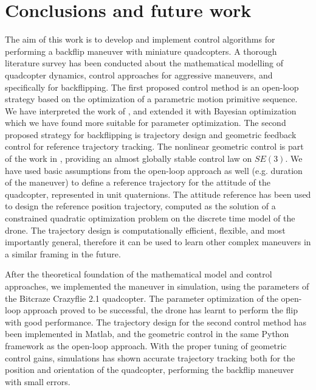 
\section{Conclusions and future work}
The aim of this work is to develop and implement control algorithms for performing a backflip maneuver with miniature quadcopters. A thorough literature survey has been conducted about the mathematical modelling of quadcopter dynamics, control approaches for aggressive maneuvers, and specifically for backflipping. The first proposed control method is an open-loop strategy based on the optimization of a parametric motion primitive sequence. We have interpreted the work of \cite{LSICRA2010}, and extended it with Bayesian optimization which we have found more suitable for parameter optimization. The second proposed strategy for backflipping is trajectory design and geometric feedback control for reference trajectory tracking. The nonlinear geometric control is part of the work in \cite{lelemc2010}, providing an almost globally stable control law on $SE(3)$. We have used basic assumptions from the open-loop approach as well (e.g. duration of the maneuver) to define a reference trajectory for the attitude of the quadcopter, represented in unit quaternions. The attitude reference has been used to design the reference position trajectory, computed as the solution of a constrained quadratic optimization problem on the discrete time model of the drone. The trajectory design is computationally efficient, flexible, and most importantly general, therefore it can be used to learn other complex maneuvers in a similar framing in the future.

After the theoretical foundation of the mathematical model and control approaches, we implemented the maneuver in simulation, using the parameters of the Bitcraze Crazyflie 2.1 quadcopter. The parameter optimization of the open-loop approach proved to be successful, the drone has learnt to perform the flip with good performance. The trajectory design for the second control method has been implemented in Matlab, and the geometric control in the same Python framework as the open-loop approach. With the proper tuning of geometric control gains, simulations has shown accurate trajectory tracking both for the position and orientation of the quadcopter, performing the backflip maneuver with small errors.

